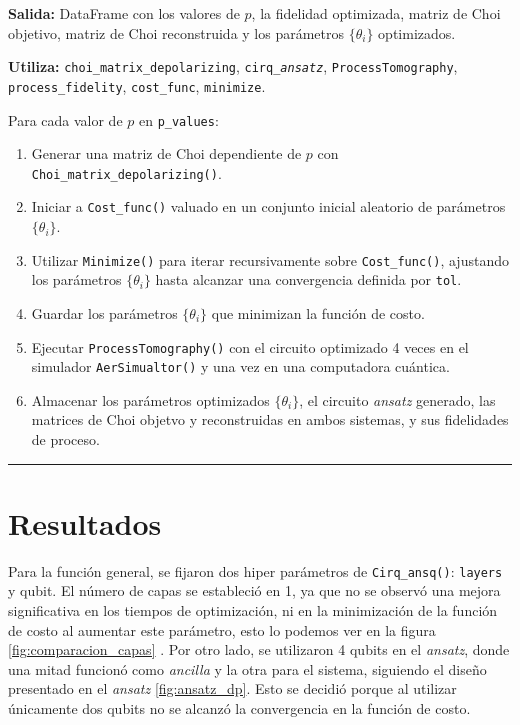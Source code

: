 \documentclass[letterpaper,12pt]{thesisECFM}
\theoremstyle{plain}
\theoremstyle{definition}
\theoremstyle{remark}
\newcommand{\1}{\mathbb{1}}
\begin{document}
\noindent\textbf{Salida:} DataFrame con los valores de $p$, la fidelidad
optimizada, matriz de Choi objetivo, matriz de Choi reconstruida y los
parámetros $\{\theta_i\}$ optimizados.

\noindent\textbf{Utiliza:} \texttt{choi\_matrix\_depolarizing},
\texttt{cirq\_\textit{ansatz}}, \texttt{ProcessTomography}, \texttt{process\_fidelity},
\texttt{cost\_func}, \texttt{minimize}. \newline

Para cada valor de $p$ en \texttt{p\_values}: 
\begin{enumerate}
    \item Generar una matriz de Choi dependiente de $p$ con \texttt{Choi\_matrix\_depolarizing()}.
    \item Iniciar a  \texttt{Cost\_func()} valuado en un conjunto inicial
aleatorio de parámetros $\{\theta_i\}$. 
   \item Utilizar \texttt{Minimize()} para iterar recursivamente sobre
\texttt{Cost\_func()}, ajustando los parámetros $\{\theta_i\}$ hasta alcanzar
una convergencia definida por \texttt{tol}.
   \item Guardar los parámetros $\{ \theta_i\}$ que minimizan la función de
costo. 
   \item Ejecutar \texttt{ProcessTomography()} con el circuito optimizado 4
veces en el simulador \texttt{AerSimualtor()} y una vez en una computadora
cuántica. 
    \item Almacenar los parámetros optimizados $\{ \theta_i\}$, el circuito
\textit{ansatz} generado, las matrices de Choi objetvo y reconstruidas en ambos
sistemas, y sus fidelidades de proceso. 
\end{enumerate}
\vspace{-.5cm}
\noindent\rule{\textwidth}{1mm}
\section{Resultados} %
Para la función general, se fijaron dos hiper parámetros de 
\texttt{Cirq\_ansq()}: \texttt{layers} y  qubit. El número de capas se
estableció en 1, ya que no se observó una mejora significativa en los tiempos
de optimización, ni en la minimización de la función de costo al aumentar este
parámetro, esto lo podemos ver en la figura \ref{fig:comparacion_capas} . Por otro lado, se utilizaron 4 qubits en el \textit{ansatz}, donde una mitad funcionó como \textit{ancilla} y la otra para el sistema, siguiendo el diseño presentado en el \textit{ansatz} \ref{fig:ansatz_dp}. Esto se decidió porque al utilizar únicamente dos  qubits no se alcanzó la convergencia en la función de costo.  
\end{document}
